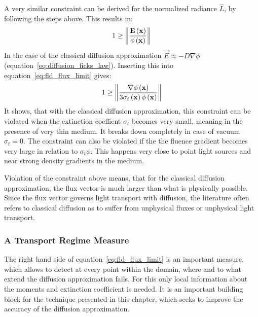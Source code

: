 A very similar constraint can be derived for the normalized radiance $\widehat{L}$, by following the steps above. This results in:
\begin{align}
\label{eq:fld_flux_limit}
1
\ge
\left\lVert
\frac{\boldsymbol{\mathbf{E}}\left(\boldsymbol{\mathbf{x}}\right)}{\phi\left(\boldsymbol{\mathbf{x}}\right)}
\right\rVert
\end{align}
In the case of the classical diffusion approximation $\vec{E}\approx-D\nabla\phi$ (equation~\ref{eq:diffusion_ficks_law}). Inserting this into equation~\ref{eq:fld_flux_limit} gives:
\begin{align}
\label{eq:fld_flux_limit}
1
\ge
\left\lVert
\frac{\nabla\phi\left(\boldsymbol{\mathbf{x}}\right)}{3\sigma_t\left(\boldsymbol{\mathbf{x}}\right)\phi\left(\boldsymbol{\mathbf{x}}\right)}
\right\rVert
\end{align}
It shows, that with the classical diffusion approximation, this constraint can be violated when the extinction coeffient $\sigma_t$ becomes very small, meaning in the presence of very thin medium. It breaks down completely in case of vacuum $\sigma_t=0$. The constraint can also be violated if the the fluence gradient becomes very large in relation to $\sigma_t\phi$. This happens very close to point light sources and near strong density gradients in the medium.

Violation of the constraint above means, that for the classical diffusion approximation, the flux vector is much larger than what is physically possible. Since the flux vector governs light transport with diffusion, the literature often refers to classical diffusion as to suffer from unphysical fluxes or unphysical light transport.


\subsubsection*{A Transport Regime Measure}

The right hand side of equation~\ref{eq:fld_flux_limit} is an important measure, which allows to detect at every point within the domain, where and to what extend the diffusion approximation fails. For this only local information about the moments and extinction coefficient is needed. It is an important building block for the technique presented in this chapter, which seeks to improve the accuracy of the diffusion approximation.


